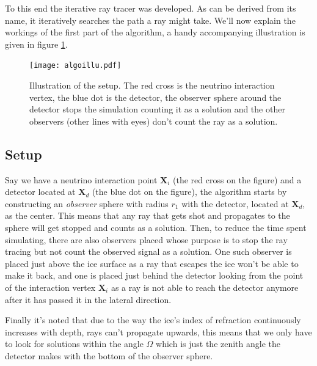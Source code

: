 To this end the iterative ray tracer \cite{2022icrc.confE1027O} was developed.
As can be derived from its name, it iteratively searches the path a ray might
take. We'll now explain the workings of the first part of the algorithm, a handy
accompanying illustration is given in figure \ref{fig:Illustration of iterative algorithm}.
\begin{figure}
  \centering
  \texttt{[image: algoillu.pdf]}
  \caption{Illustration of the setup. The red cross is the neutrino interaction vertex, the blue dot is the detector,
  the observer sphere around the detector stops the simulation counting it as a solution and the other observers (other lines with eyes) don't count the ray as a solution.}
  \label{fig:Illustration of iterative algorithm}
\end{figure}
\subsection{Setup}
Say we have a neutrino interaction point $\mathbf{X}_i$
(the red cross on the figure) and a detector located at $\mathbf{X}_d$ (the
blue dot on the figure), the algorithm starts by constructing an
\textit{observer} sphere with radius $r_1$ with the detector, located at $\mathbf{X}_d$, as the
center.  This means that any ray that gets shot and propagates to the sphere
will get stopped and counts as a solution.  Then, to reduce the time spent simulating, there are also observers placed
whose purpose is to stop the ray tracing but not count the observed signal as a solution.
One such observer is placed 
just above the ice surface as a ray that escapes the ice won't be able to make it back, and one
is placed just behind the detector looking from the point of the interaction vertex $\mathbf{X}_i$ as
a ray is not able to reach the detector anymore after it has passed it in the
lateral direction. 

Finally it's noted that due to the way the ice's index of refraction
continuously increases with depth, rays can't propagate upwards, this means that we only 
have to look for solutions within the angle $\Omega$ which is just the zenith angle the detector
makes with the bottom of the observer sphere.


